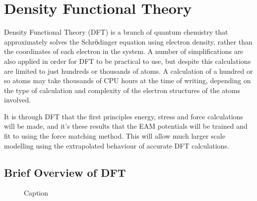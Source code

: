 

\section{Density Functional Theory}

Density Functional Theory (DFT) is a branch of quantum chemistry that approximately solves the Schrӧdinger equation using electron density, rather than the coordinates of each electron in the system.  A number of simplifications are also applied in order for DFT to be practical to use, but despite this calculations are limited to just hundreds or thousands of atoms.  A calculation of a hundred or so atoms may take thousands of CPU hours at the time of writing, depending on the type of calculation and complexity of the electron structures of the atoms involved.

It is through DFT that the first principles energy, stress and force calculations will be made, and it's these results that the EAM potentials will be trained and fit to using the force matching method.  This will allow much larger scale modelling using the extrapolated behaviour of accurate DFT calculations.



\subsection{Brief Overview of DFT}


\begin{figure}[!h]
\centering
{}
\caption{Caption}
\label{fig:decaychain}
\end{figure}



